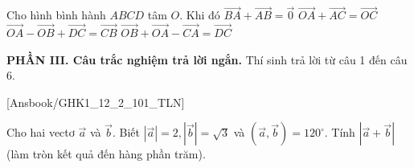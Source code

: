 \documentclass[12pt,a4paper,openany,oneside]{book}
\newcommand{\phanDe}[1]{\par\medskip\noindent #1\par\smallskip}
\begin{document}
\begin{ex}%
	Cho hình bình  hành $ABCD$ tâm $O$. Khi đó
	\choiceTF 
		{\True $\overrightarrow{BA}+\overrightarrow{AB}=\vec{0}$} 
		{\True $\overrightarrow{OA}+\overrightarrow{AC}=\overrightarrow{OC}$} 
		 {$\overrightarrow{OA}-\overrightarrow{OB}+\overrightarrow{DC}=\overrightarrow{CB}$}
		{\True $\overrightarrow{OB}+\overrightarrow{OA}-\overrightarrow{CA}=\overrightarrow{DC}$} 
\end{ex}


\phanDe{\textbf{PHẦN III. Câu trắc nghiệm trả lời ngắn.} Thí sinh trả lời từ câu 1 đến câu 6.}

\setcounter{bt}{0}

[Ansbook/GHK1_12_2_101_TLN]

\begin{bt}%
	Cho hai vectơ $\overrightarrow{a}$ và $\overrightarrow{b}$. Biết $\left|\overrightarrow{a}\right|=2,\left|\overrightarrow{b}\right|=\sqrt{3}$ và $\left(\overrightarrow{a}, \overrightarrow{b}\right)=120^{\circ}$. Tính $\left|\overrightarrow{a}+\overrightarrow{b}\right|$ (làm tròn kết quả đến  hàng phần trăm).
\end{bt}
\end{document}
